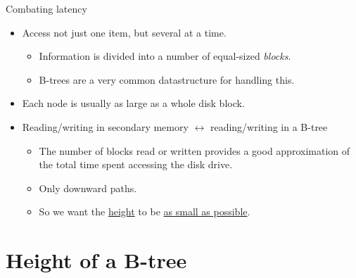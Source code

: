 \documentclass[11pt,t]{beamer}
\begin{document}
	\begin{frame}{Combating latency}
		\begin{itemize}[<+->]
			\item Access not just one item, but several at a time.
			\begin{itemize}
				\item Information is divided into a number of equal-sized \textit{blocks}.
				\item B-trees are a very common datastructure for handling this.
			\end{itemize}
			\item Each node is usually as large as a whole disk block.
			\item Reading/writing in secondary memory \(\leftrightarrow\) reading/writing in a B-tree
			\begin{itemize}[<+->]
				\item The number of blocks read or written provides a good approximation of the total time spent accessing the disk drive.
				\item Only downward paths.
				\item So we want the \underline{height} to be \underline{as small as possible}.
			\end{itemize}
		\end{itemize}
	\end{frame}

	\section{Height of a B-tree}
\end{document}

